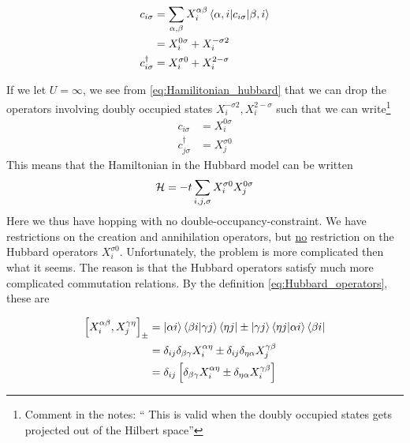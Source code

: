 
\begin{theorem}
\begin{align*}
c_{i\sigma} &= \sum_{\alpha, \beta}X_i^{\alpha\beta}\mel{\alpha, i}{c_{i\sigma}}{\beta, i} \\
&= X_i^{0\sigma} + X_i^{-\sigma 2} \\
c_{i\sigma}^\dagger &= X_i^{\sigma 0} + X_i^{2-\sigma}
\end{align*}
\end{theorem}

If we let $U = \infty$, we see from \eqref{eq:Hamilitonian_hubbard} that we can drop the operators involving doubly occupied states \(X_i^{-\sigma 2},X_i^{2-\sigma}\) such that we can write\footnote{Comment in the notes: `` This is valid when the doubly occupied states gets projected out of the Hilbert space''} 
\begin{align}
\label{eq:hubbard_ops_ca}
c_{i\sigma} &= X_i^{0\sigma} \\
c_{j\sigma}^\dagger &= X_j^{\sigma 0}
\end{align}
This means that the Hamiltonian in the Hubbard model can be written 
\begin{equation}
\label{eq:hubbard_ham}
\mathcal{H} = -t\sum_{i,j,\sigma}X_i^{\sigma 0}X_j^{0\sigma}
\end{equation}
Here we thus have hopping with no double-occupancy-constraint. We have restrictions on the creation and annihilation operators, but \underline{no} restriction on the Hubbard operators \(X_i^{\sigma 0}\). Unfortunately, the problem is more complicated then what it seems. The reason is that the Hubbard operators satisfy much more complicated commutation relations. By the definition \eqref{eq:Hubbard_operators}, these are

\begin{align}
\comm{X_i^{\alpha\beta}}{X_j^{\gamma\eta}}_\pm 
&= \ket{\alpha i}\braket{\beta i}{\gamma j}\bra{\eta j} \pm \ket{\gamma j}\braket{\eta j}{\alpha i}\bra{\beta i} \nonumber \\
&= \delta_{ij}\delta_{\beta\gamma}X_i^{\alpha\eta} \pm \delta_{ij}\delta_{\eta\alpha}X_j^{\gamma\beta} \nonumber\\
&= \delta_{ij}\left[\delta_{\beta\gamma}X_i^{\alpha\eta} \pm \delta_{\eta\alpha}X_i^{\gamma\beta}\right]
\end{align}

